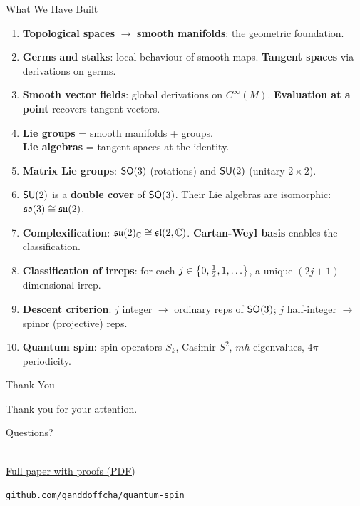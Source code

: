 \documentclass[9pt]{beamer}
\begin{document}
\begin{frame}{What We Have Built}
\begin{enumerate}
\item \textbf{Topological spaces} $\to$ \textbf{smooth manifolds}: the
geometric foundation.

\pause
\item \textbf{Germs and stalks}: local behaviour of smooth maps.
\textbf{Tangent spaces} via derivations on germs.

\pause
\item \textbf{Smooth vector fields}: global derivations on $C^\infty(M)$.
\textbf{Evaluation at a point} recovers tangent vectors.

\pause
\item \textbf{Lie groups} = smooth manifolds + groups.\\
\textbf{Lie algebras} = tangent spaces at the identity.

\pause
\item \textbf{Matrix Lie groups}: $\operatorname{\mathsf{SO}}(3)$ (rotations) and $\operatorname{\mathsf{SU}}(2)$ (unitary $2\times2$).

\pause
\item $\operatorname{\mathsf{SU}}(2)$ is a \textbf{double cover} of $\operatorname{\mathsf{SO}}(3)$.
Their Lie algebras are isomorphic: $\mathfrak{so}(3)\cong\mathfrak{su}(2)$.

\pause
\item \textbf{Complexification}: $\mathfrak{su}(2)_{\mathbb{C}}\cong\mathfrak{sl}(2,\mathbb{C})$.
\textbf{Cartan-Weyl basis} enables the classification.

\pause
\item \textbf{Classification of irreps}: for each $j\in\set{0,\tfrac12,1,\dots}$,
a unique $(2j+1)$-dimensional irrep.

\pause
\item \textbf{Descent criterion}: $j$ integer $\to$ ordinary reps of $\operatorname{\mathsf{SO}}(3)$;
$j$ half-integer $\to$ spinor (projective) reps.

\pause
\item \textbf{Quantum spin}: spin operators $S_k$, Casimir $S^2$,
$m\hbar$ eigenvalues, $4\pi$ periodicity.
\end{enumerate}
\end{frame}

\begin{frame}{Thank You}
\begin{center}
\Large Thank you for your attention.

\vspace{1em}
\normalsize
Questions?

\vspace{1em}
\\[0.3em]
{\footnotesize\textcolor{blue}{\href{https://raw.githubusercontent.com/ganddoffcha/quantum-spin/main/gordon-chan-quantum-spin.pdf}{Full paper with proofs (PDF)}}}

\vspace{0.5em}
\tiny
\texttt{github.com/ganddoffcha/quantum-spin}
\end{center}
\end{frame}
\end{document}
